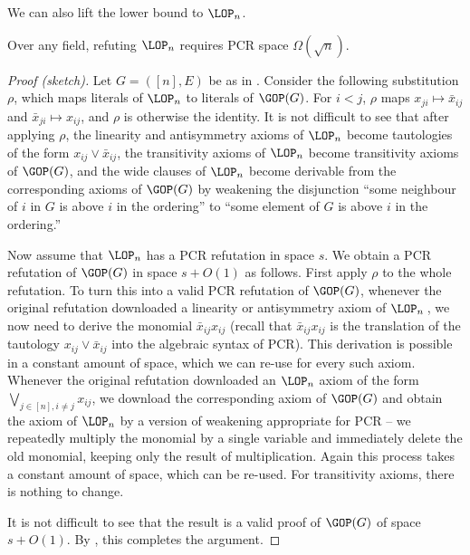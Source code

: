 \documentclass{toc}
\begin{document}
We can also lift the lower bound to $\LOP_n$.
\begin{corollary} 
Over any field, refuting $\LOP_n$ requires PCR space $\Omega(\sqrt{n})$. 
\end{corollary}
%
\begin{proof}[Proof (sketch)] %
Let  $G=([n],E)$ be as in .
Consider the following substitution $\rho$,
which maps literals of $\LOP_n$ to literals of $\GOP(G)$.
For $i<j$,
$\rho$ maps $x_{ji} \mapsto \bar x_{ij}$
and $\bar x_{ji} \mapsto x_{ij}$, 
and $\rho$ is otherwise the identity.
It is not difficult to see that after applying $\rho$, the linearity and antisymmetry axioms of $\LOP_n$ become
tautologies of the form $x_{ij} \vee \bar x_{ij}$,
the transitivity axioms of $\LOP_n$ become transitivity axioms of $\GOP(G)$,
and the  wide clauses of $\LOP_n$ become 
derivable from the corresponding axioms of $\GOP(G)$
by weakening the disjunction 
``some neighbour of $i$ in $G$ is above $i$ in the ordering''
to ``some element of $G$ is above $i$ in the ordering.''

Now assume that $\LOP_n$ has a PCR refutation in space $s$. 
We obtain a PCR refutation of $\GOP(G)$ 
in space $s+O(1)$ as follows.
First apply $\rho$ to the whole refutation. To turn this into a valid PCR refutation of $\GOP(G)$, 
whenever the original refutation downloaded a linearity or antisymmetry axiom of $\LOP_n$\,, 
we now need to derive the monomial $\bar x_{ij}  x_{ij}$ 
(recall that $\bar x_{ij} x_{ij}$ is the translation of the
tautology $x_{ij} \vee \bar x_{ij}$ into the algebraic syntax of PCR).
This derivation is possible in a constant amount of space, which we
can re-use for every such axiom.
Whenever the original refutation downloaded an $\LOP_n$ axiom of the form $\bigvee_{j\in [n], i\not =j} x_{ij}$,
we download the corresponding axiom of $\GOP(G)$ and obtain the axiom of $\LOP_n$ by a version of weakening appropriate for PCR -- 
we repeatedly multiply the monomial by a single variable and immediately delete the old monomial, keeping only the result of multiplication.
Again this process takes a constant amount of space, which can be re-used.
For transitivity axioms, there is nothing to change. 

It is not difficult to see that the result is a valid proof of $\GOP(G)$ of space~$s+O(1)$.
By , this completes the argument.
\end{proof}
\end{document}
